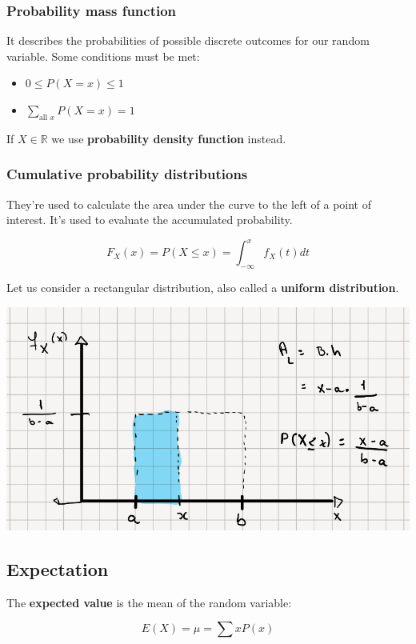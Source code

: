 \documentclass[12pt]{book}
\theoremstyle{definition}
\begin{document}
\subsubsection{Probability mass function} 
It describes the probabilities of possible discrete outcomes for our random variable. Some conditions must be met:
\begin{itemize}
    \item $0 \leq P(X = x) \leq 1$
    \item $\sum_{\text{all } x} P(X = x) = 1$
\end{itemize}

If $X \in \mathbb{R}$ we use \textbf{probability density function} instead.

\subsubsection{Cumulative probability distributions}
They're used to calculate the area under the curve to the left of a point of interest. It's used to evaluate the accumulated probability.

\[
    F_X(x) = P(X \leq x) = \int_{- \infty}^{x} f_X(t) dt
\]

Let us consider a rectangular distribution, also called a \textbf{uniform distribution}.

\begin{center}
    \includegraphics[scale=0.5]{./assets/cdf.png}
\end{center}

\subsection{Expectation}
The \textbf{expected value} is the mean of the random variable:

\[
    E(X) = \mu = \sum xP(x)
\]
\end{document}
